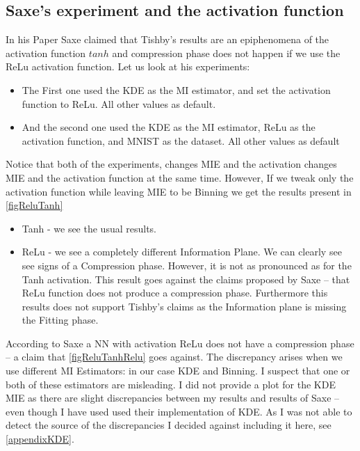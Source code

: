 \documentclass[dissertation.tex]{subfiles}
\begin{document}
\subsection{Saxe's experiment and the activation function} \label{subEvalSaxe}

In his Paper Saxe claimed that Tishby's results are an epiphenomena of the
activation function $tanh$ and compression phase does not happen if we use the
ReLu activation function. Let us look at his experiments:
\begin{itemize}
  \item{
      The First one used the KDE as the MI estimator, and set the activation
      function to ReLu. All other values as default.
    }
  \item{
      And the second one used the KDE as the MI estimator, ReLu as the
      activation function, and MNIST as the dataset. All other values as default
    }
\end{itemize}
Notice that both of the experiments, changes MIE and the activation changes MIE
and the activation function at the same time. However, If we tweak only the
activation function while leaving MIE to be Binning we get the results present
in \autoref{figReluTanh}
\begin{itemize}
  \item{
      Tanh - we see the usual results.
    }
  \item{
      ReLu - we see a completely different Information Plane. We can clearly see
      see signs of a Compression phase. However, it is not as pronounced
      as for the Tanh activation. This result goes against the claims proposed
      by Saxe -- that ReLu function does not produce a compression phase.
      Furthermore this results does not support Tishby's claims as the
      Information plane is missing the Fitting phase.
    }
\end{itemize}
According to Saxe a NN with activation ReLu does not have a compression phase --
a claim that \autoref{figReluTanhRelu} goes against. The discrepancy arises when
we use different MI Estimators: in our case KDE and Binning. I suspect that one
or both of these estimators are misleading. I did not provide a plot for the KDE
MIE as there are slight discrepancies between my results and results of Saxe --
even though I have used used their implementation of KDE. As I was not able to
detect the source of the discrepancies I decided against including it here, see
\autoref{appendixKDE}.
\end{document}
